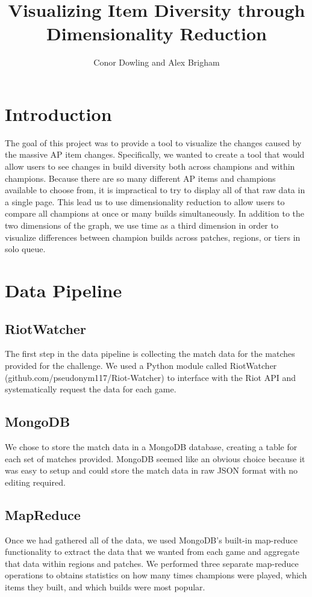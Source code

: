 \documentclass[11pt]{amsart}
\title{Visualizing Item Diversity through Dimensionality Reduction}
\author{Conor Dowling and Alex Brigham}
\begin{document}
\maketitle


\section{Introduction}

The goal of this project was to provide a tool to visualize the changes caused by the massive AP item changes. Specifically, we wanted to create a tool that would allow users to see changes in build diversity both across champions and within champions. Because there are so many different AP items and champions available to choose from, it is impractical to try to display all of that raw data in a single page. This lead us to use dimensionality reduction to allow users to compare all champions at once or many builds simultaneously. In addition to the two dimensions of the graph, we use time as a third dimension in order to visualize differences between champion builds across patches, regions, or tiers in solo queue.\\

\section{Data Pipeline}
\subsection{RiotWatcher}
The first step in the data pipeline is collecting the match data for the matches provided for the challenge. We used a Python module called RiotWatcher (github.com/pseudonym117/Riot-Watcher) to interface with the Riot API and systematically request the data for each game.\\

\subsection{MongoDB}
We chose to store the match data in a MongoDB database, creating a table for each set of matches provided. MongoDB seemed like an obvious choice because it was easy to setup and could store the match data in raw JSON format with no editing required.\\

\subsection{MapReduce}
Once we had gathered all of the data, we used MongoDB's built-in map-reduce functionality to extract the data that we wanted from each game and aggregate that data within regions and patches. We performed three separate map-reduce operations to obtains statistics on how many times champions were played, which items they built, and which builds were most popular.\\
\end{document}
